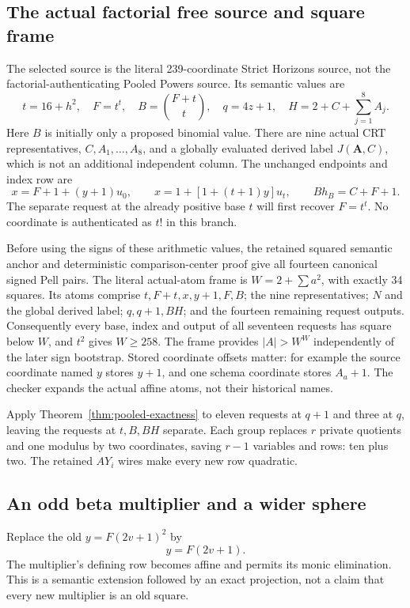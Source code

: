 \subsection{The actual factorial free source and square frame}
The selected source is the literal 239-coordinate Strict Horizons source,
not the factorial-authenticating Pooled Powers source. Its semantic values
are
\[
 t=16+h^2,\quad F=t^t,\quad B=\binom{F+t}{t},\quad
 q=4z+1,\quad H=2+C+\sum_{j=1}^8A_j.
\]
Here $B$ is initially only a proposed binomial value. There are nine actual
CRT representatives, $C,A_1,\ldots,A_8$, and a globally evaluated derived
label $J(\boldsymbol A,C)$, which is not an additional independent column.
The unchanged endpoints and index row are
\begin{equation}\label{eq:strict-endpoints}
 x=F+1+(y+1)u_0,\qquad
 x=1+[1+(t+1)y]u_t,\qquad Bh_B=C+F+1.
\end{equation}
The separate request at the already positive base $t$ will first recover
$F=t^t$. No coordinate is authenticated as $t!$ in this branch.

Before using the signs of these arithmetic values, the retained squared
semantic anchor and deterministic comparison-center proof give all
fourteen canonical signed Pell pairs. The literal actual-atom frame is
$W=2+\sum a^2$, with exactly 34 squares. Its atoms comprise
$t,F+t,x,y+1,F,B$; the nine representatives; $N$ and the global derived
label; $q,q+1,BH$; and the fourteen remaining request outputs.
Consequently every base, index and output of all seventeen requests has
square below $W$, and $t^2$ gives $W\ge258$.
The frame provides $|A|>W^W$ independently of the later sign bootstrap.
Stored coordinate offsets matter: for example the source coordinate
named $y$ stores $y+1$, and one schema coordinate stores $A_a+1$.
The checker expands the actual affine atoms, not their historical names.

Apply Theorem~\ref{thm:pooled-exactness} to eleven requests at $q+1$
and three at $q$, leaving the requests at $t,B,BH$ separate.
Each group replaces $r$ private quotients and one modulus by two
coordinates, saving $r-1$ variables and rows: ten plus two.
The retained $AY_i$ wires make every new row quadratic.

\subsection{An odd beta multiplier and a wider sphere}
Replace the old $y=F(2v+1)^2$ by
\begin{equation}\label{eq:odd-beta}
 y=F(2v+1).
\end{equation}
The multiplier's defining row becomes affine and permits its monic
elimination. This is a semantic extension followed by an exact projection,
not a claim that every new multiplier is an old square.

